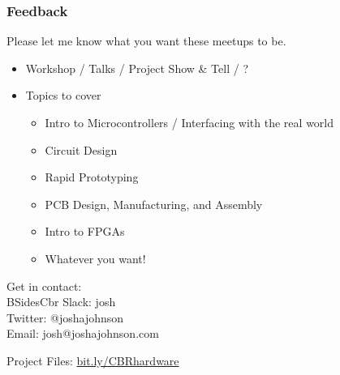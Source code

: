 \documentclass[t]{beamer}
\begin{document}
\begin{frame}
\frametitle{Feedback}
Please let me know what you want these meetups to be. \\
\begin{itemize}
\item Workshop / Talks / Project Show \& Tell / ?
\item Topics to cover
\begin{itemize}
	\item Intro to Microcontrollers / Interfacing with the real world
	\item Circuit Design
	\item Rapid Prototyping
	\item PCB Design, Manufacturing, and Assembly
	\item Intro to FPGAs
	\item Whatever you want!
\end{itemize}
\end{itemize}
\vspace{5mm}
Get in contact: \\
BSidesCbr Slack: josh\\
Twitter: @\textunderscore joshajohnson\\
Email: josh@joshajohnson.com\\
\vspace{5mm}

Project Files: \url{bit.ly/CBRhardware}\\
\end{frame}
\end{document}
